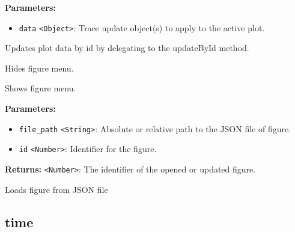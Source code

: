 \documentclass[12pt,a4paper]{article}
\begin{document}
\vspace{5mm}
\noindent {}


\noindent \textbf{Parameters:}
\begin{itemize}
  \item \texttt{data} \texttt{<Object>}: Trace update object(s) to apply to the active plot.
\end{itemize}

\noindent Updates plot data by id by delegating to the \textasciigrave{}updateById\textasciigrave{} method.

\vspace{5mm}
\noindent {}


\noindent Hides figure menu.

\vspace{5mm}
\noindent {}


\noindent Shows figure menu.

\vspace{5mm}
\noindent {}


\noindent \textbf{Parameters:}
\begin{itemize}
  \item \texttt{file\_path} \texttt{<String>}: Absolute or relative path to the JSON file of figure.
  \item \texttt{id} \texttt{<Number>}: Identifier for the figure.
\end{itemize}

\noindent \textbf{Returns:} \texttt{<Number>}: The identifier of the opened or updated figure.

\noindent Loads figure from JSON file


\subsection{time}
\vspace{5mm}
\noindent {}\vspace{4mm}
\end{document}
